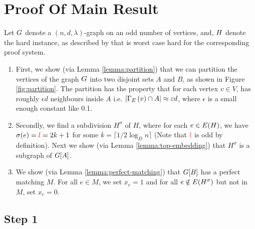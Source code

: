 \documentclass[11pt]{article}
\newcommand{\PerfectMatching}[1]{\mathsf{PM}\left(#1\right)}
\newcommand{\EnDeeLambda}{(n, d, \lambda)}
\newcommand{\Subdivision}[2]{{#1}^{#2}}
\begin{document}
\section{Proof Of Main Result}

Let $G$ denote a $\EnDeeLambda$-graph on an odd number of vertices, and,  $H$ denote the hard instance, as described by  that is worst case hard for the corresponding proof system.


\begin{enumerate}
	\item First, we show (via Lemma \ref{lemma:partition}) that we can partition the vertices of the graph $G$ into two disjoint sets $A$ and $B$, as shown in Figure \ref{fig:partition}. The partition has the property that for each vertex $v \in V$, has roughly $\epsilon d$ neighbours inside $A$ i.e. $|\Gamma_{E}\left(v\right) \cap A| \approx \varepsilon d$, where $\epsilon$ is a small enough constant like 0.1.
	\item Secondly, we find a subdivision $\Subdivision{H}{\sigma}$ of $H$, where for each $e \in E(H)$, we have $\sigma(e) = \textcolor{red}{l} =2k+1$ for some $k = \lceil 1/2\log_{D}n\rceil$ (Note that $\textcolor{red}{l}$ is odd by definition). Next we show (via Lemma \ref{lemma:top-embedding}) that $\Subdivision{H}{\sigma}$ is a subgraph of $G[A]$.
	
	\item We show (via Lemma \ref{lemma:perfect-matching}) that $G[B]$ has a perfect matching $M$. For all $e \in M$, we set $x_e = 1$ and for all $e \notin \Edges{\Subdivision{H}{\sigma}}$ but not in $M$, set $x_e = 0$.
\end{enumerate}

\subsection{Step 1}
\end{document}
